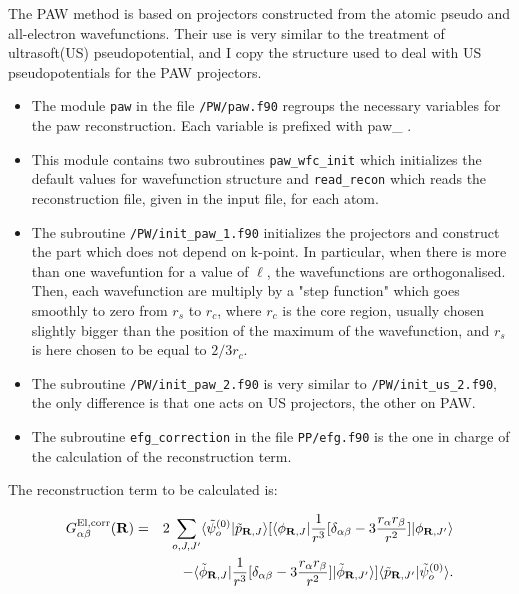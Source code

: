 \documentclass[11pt, a4paper]{article}
\begin{document}
The PAW method is based on projectors constructed from the atomic
pseudo and all-electron wavefunctions. Their use is very similar to
the treatment of ultrasoft(US) pseudopotential, and I copy the
structure used to deal with US pseudopotentials for the PAW
projectors.
\begin{itemize}
\item The module \verb+paw+ in the file \verb+/PW/paw.f90+ regroups
the necessary variables for the paw reconstruction. Each variable is
prefixed with paw\_ .
\item This module contains two subroutines \verb+paw_wfc_init+ which
initializes the default values for wavefunction structure and
\verb+read_recon+ which reads the reconstruction file, given in the
input file, for each atom.
\item The subroutine \verb+/PW/init_paw_1.f90+ initializes the
projectors and construct the part which does not depend on k-point. In
particular, when there is more than one wavefuntion for a value of
$\ell$, the wavefunctions are orthogonalised.  Then, each wavefunction
are multiply by a "step function" which goes smoothly to zero from
$r_s$ to $r_c$, where $r_c$ is the core region, usually chosen
slightly bigger than the position of the maximum of the wavefunction,
and $r_s$ is here chosen to be equal to $2/3 r_c$.
\item The subroutine \verb+/PW/init_paw_2.f90+ is very similar to
\verb+/PW/init_us_2.f90+, the only difference is that one acts on US
projectors, the other on PAW.
\item The subroutine \verb+efg_correction+ in the file
\verb+PP/efg.f90+ is the one in charge of the calculation of the
reconstruction term.
\end{itemize}

The reconstruction term to be calculated is:

\begin{eqnarray}
G_{\alpha\beta}^{{\rm El},{\rm corr}} ({\bf R})
&=&2\sum_{o,J,J^{\prime}} \langle\tilde{\psi}_o^{(0)}|\tilde{p}_{{\bf
R},J} \rangle [\langle \phi_{{\bf R},J} | \frac{1} { r^3
}[\delta_{\alpha\beta} -3 \frac{r_\alpha r_\beta} { r^2 }]| \phi_{{\bf
R},J^{\prime}} \rangle \nonumber \\ &&- \langle \tilde{\phi}_{{\bf
R},J} | \frac{1} { {r} ^3 } [\delta_{\alpha\beta} -3 \frac{r_\alpha
r_\beta} { r^2 }]| \tilde{\phi}_{{\bf R},J^{\prime}} \rangle ] \langle
\tilde{p}_{{\bf R},J^{\prime}}|\tilde{\psi}_o^{(0)}\rangle
\label{G_recons}.
\end{eqnarray}
\end{document}

